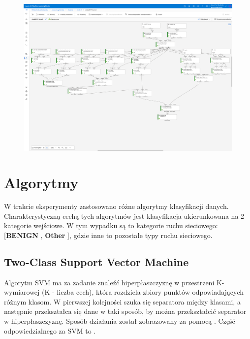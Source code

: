 \begin{landscape}
\begin{figure}[H]
    \centering
    \includegraphics[height=0.9\textwidth]{images/pipeline}
    \label{fig:pipeline}
\end{figure}
\end{landscape}

\section{Algorytmy}
W trakcie eksperymenty zastosowano różne algorytmy klasyfikacji danych. Charakterystyczną cechą tych algorytmów jest klasyfikacja ukierunkowana na 2 kategorie wejściowe. W tym wypadku są to kategorie ruchu sieciowego: [\textbf{BENIGN} , \textbf{Other} ], gdzie inne to pozostałe typy ruchu sieciowego.

\subsection{Two-Class Support Vector Machine}
Algorytm SVM ma za zadanie znaleźć hiperpłaszczyznę w przestrzeni K-wymiarowej (K - liczba cech), która rozdziela zbiory punktów odpowiadających różnym klasom. W pierwszej kolejności szuka się separatora między klasami, a następnie przekształca się dane w taki sposób, by można przekształcić separator w hiperpłaszczyznę\cite{IBM}. Sposób działania został zobrazowany za pomocą . Część  odpowiedzialnego za SVM to .

